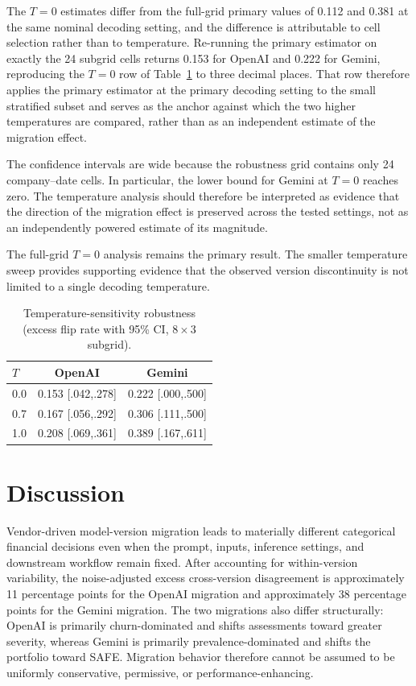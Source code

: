 \documentclass{ieeeaccess}
\begin{document}
The $T=0$ estimates differ from the full-grid primary values of 0.112 and 0.381 at the same nominal decoding setting, and the difference is attributable to cell selection rather than to temperature. Re-running the primary estimator on exactly the 24 subgrid cells returns 0.153 for OpenAI and 0.222 for Gemini, reproducing the $T=0$ row of Table~\ref{tab:temp} to three decimal places. That row therefore applies the primary estimator at the primary decoding setting to the small stratified subset and serves as the anchor against which the two higher temperatures are compared, rather than as an independent estimate of the migration effect.

The confidence intervals are wide because the robustness grid contains only 24 company--date cells. In particular, the lower bound for Gemini at $T=0$ reaches zero. The temperature analysis should therefore be interpreted as evidence that the direction of the migration effect is preserved across the tested settings, not as an independently powered estimate of its magnitude.

The full-grid $T=0$ analysis remains the primary result. The smaller temperature sweep provides supporting evidence that the observed version discontinuity is not limited to a single decoding temperature.

\begin{table}[t]
\centering
\caption{Temperature-sensitivity robustness (excess flip rate with 95\% CI, $8\times3$ subgrid).}
\label{tab:temp}
\small
\begin{tabular}{@{}lcc@{}}
\toprule
$T$ & OpenAI & Gemini \\
\midrule
0.0 & 0.153 [.042,.278] & 0.222 [.000,.500] \\
0.7 & 0.167 [.056,.292] & 0.306 [.111,.500] \\
1.0 & 0.208 [.069,.361] & 0.389 [.167,.611] \\
\bottomrule
\end{tabular}
\end{table}

\section{Discussion}
\label{sec:disc}
Vendor-driven model-version migration leads to materially different categorical financial decisions even when the prompt, inputs, inference settings, and downstream workflow remain fixed. After accounting for within-version variability, the noise-adjusted excess cross-version disagreement is approximately 11 percentage points for the OpenAI migration and approximately 38 percentage points for the Gemini migration. The two migrations also differ structurally: OpenAI is primarily churn-dominated and shifts assessments toward greater severity, whereas Gemini is primarily prevalence-dominated and shifts the portfolio toward SAFE. Migration behavior therefore cannot be assumed to be uniformly conservative, permissive, or performance-enhancing.
\end{document}
